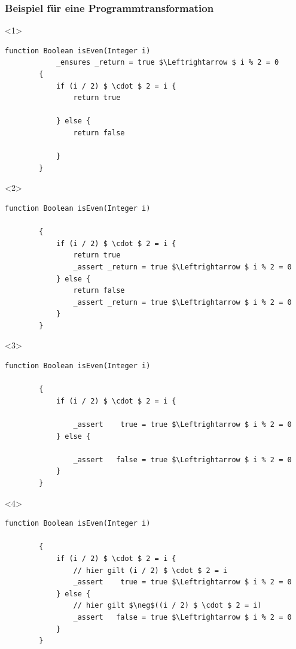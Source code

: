 \documentclass[t,svgnames]{beamer}
\begin{document}
\begin{frame}[fragile]
	\frametitle{Beispiel für eine Programmtransformation}
	
	\begin{onlyenv}
	\begin{lstlisting}[frame=lines,mathescape=true]
		function Boolean isEven(Integer i)
		    _ensures _return = true $\Leftrightarrow $ i % 2 = 0
		{
		    if (i / 2) $ \cdot $ 2 = i {
		        return true
		        
		    } else {
		        return false
		        
		    }
		}
	\end{lstlisting}
	\end{onlyenv}
	
	\begin{onlyenv}
	\begin{lstlisting}[frame=lines,mathescape=true]
		function Boolean isEven(Integer i)
		
		{
		    if (i / 2) $ \cdot $ 2 = i {
		        return true
		        _assert _return = true $\Leftrightarrow $ i % 2 = 0
		    } else {
		        return false
		        _assert _return = true $\Leftrightarrow $ i % 2 = 0
		    }
		}
	\end{lstlisting}
	\end{onlyenv}
	
	\begin{onlyenv}
	\begin{lstlisting}[frame=lines,mathescape=true]
		function Boolean isEven(Integer i)
		
		{
		    if (i / 2) $ \cdot $ 2 = i {
		    
		        _assert    true = true $\Leftrightarrow $ i % 2 = 0
		    } else {
		    
		        _assert   false = true $\Leftrightarrow $ i % 2 = 0
		    }
		}
	\end{lstlisting}
	\end{onlyenv}
	
		\begin{onlyenv}<4>
	\begin{lstlisting}[frame=lines,mathescape=true]
		function Boolean isEven(Integer i)
		
		{
		    if (i / 2) $ \cdot $ 2 = i {
		        // hier gilt (i / 2) $ \cdot $ 2 = i
		        _assert    true = true $\Leftrightarrow $ i % 2 = 0
		    } else {
		        // hier gilt $\neg$((i / 2) $ \cdot $ 2 = i)
		        _assert   false = true $\Leftrightarrow $ i % 2 = 0
		    }
		}
	\end{lstlisting}
	\end{onlyenv}
	

\end{frame}
\end{document}
